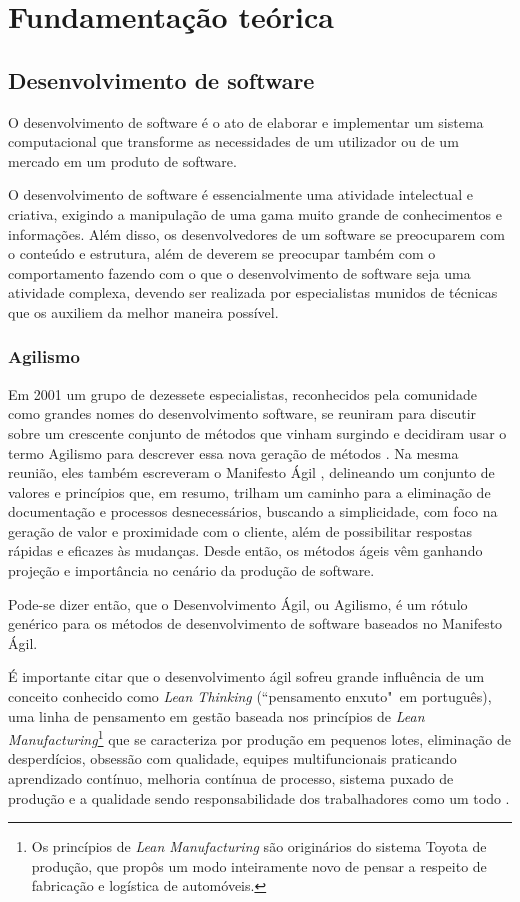 \chapter{Fundamentação teórica}
\label{cha:fundamentacao_teorica}

\section{Desenvolvimento de software}
\label{sec:desenvolvimento_de_software}

O desenvolvimento de software é o ato de elaborar e implementar um sistema computacional que transforme as necessidades de um utilizador ou de um mercado em um produto de software.

O desenvolvimento de software é essencialmente uma atividade intelectual e criativa, exigindo a manipulação de uma gama muito grande de conhecimentos e informações. Além disso, os desenvolvedores de um software se preocuparem com o conteúdo e estrutura, além de deverem se preocupar também com o comportamento fazendo com o que o desenvolvimento de software seja uma atividade complexa, devendo ser realizada por especialistas munidos de técnicas que os auxiliem da melhor maneira possível.


\subsection{Agilismo}
\label{sub:agilismo}

Em 2001 um grupo de dezessete especialistas, reconhecidos pela comunidade como grandes nomes do desenvolvimento software, se reuniram para discutir sobre um crescente conjunto de métodos que vinham surgindo e decidiram usar o termo Agilismo para descrever essa nova geração de métodos \cite{AgileStory}. Na mesma reunião, eles também escreveram o Manifesto Ágil \cite{AgileManifesto}, delineando um conjunto de valores e princípios que, em resumo, trilham um caminho para a eliminação de documentação e processos desnecessários, buscando a simplicidade, com foco na geração de valor e proximidade com o cliente, além de possibilitar respostas rápidas e eficazes às mudanças. Desde então, os métodos ágeis vêm ganhando projeção e importância no cenário da produção de software.

Pode-se dizer então, que o Desenvolvimento Ágil, ou Agilismo, é um rótulo genérico para os métodos de desenvolvimento de software baseados no Manifesto Ágil.

É importante citar que o desenvolvimento ágil sofreu grande influência de um conceito conhecido como \textit{Lean Thinking} (``pensamento enxuto"\ em português), uma linha de pensamento em gestão baseada nos princípios de \textit{Lean Manufacturing}\footnote{Os princípios de \textit{Lean Manufacturing} são originários do sistema Toyota de produção, que propôs um modo inteiramente novo de pensar a respeito de fabricação e logística de automóveis.} que se caracteriza por produção em pequenos lotes, eliminação de desperdícios, obsessão com qualidade, equipes multifuncionais praticando aprendizado contínuo, melhoria contínua de processo, sistema puxado de produção e a qualidade sendo responsabilidade dos trabalhadores como um todo \cite{BDDRodrigo}.

